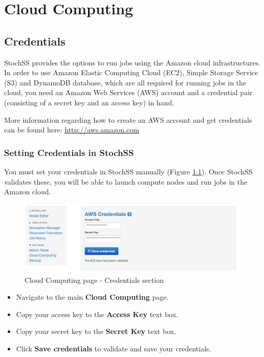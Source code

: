 \chapter{Cloud Computing}

\section{Credentials}
StochSS provides the options to run jobs using the Amazon cloud infrastructures. In order to use Amazon Elastic Computing Cloud (EC2), Simple Storage Service (S3) and DynamoDB database, which are all required for running jobs in the cloud, you need an Amazon Web Services (AWS) account and a credential pair (consisting of a secret key and an access key) in hand. 

More information regarding how to create an AWS account and get credentials can be found here: \url{http://aws.amazon.com}

\subsection{Setting Credentials in StochSS}
You must set your credentials in StochSS manually (Figure \ref{fig:1}). Once StochSS validates these, you will be able to launch compute nodes and run jobs in the Amazon cloud.

\begin{figure}[!ht]
\centering
\includegraphics[scale=0.45]{T6/T6_fig_credentials.png}
\caption{Cloud Computing page - Credentials section}
\label{fig:1}
\end{figure}

\begin{itemize}
\item Navigate to the main \textbf{Cloud Computing} page.
\item Copy your access key to the \textbf{Access Key} text box.
\item Copy your secret key to the \textbf{Secret Key} text box. 
\item Click \textbf{Save credentials} to validate and save your credentials.
\end{itemize}

